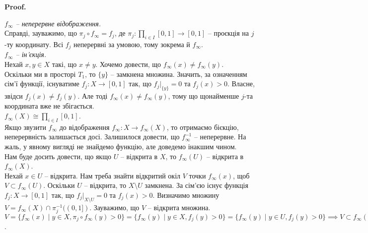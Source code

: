 \documentclass[a4paper, 10pt]{article}
\makeatletter
\theoremstyle{theoremdd}
\renewenvironment{proof}[1][Proof.\\]{\par
\pushQED{\hfill \qed}%
\normalfont \topsep6\p@\@plus6\p@\relax
\trivlist
\item\relax
{\bfseries
#1\@addpunct{.}}\hspace\labelsep\ignorespaces
}{%
\popQED\endtrivlist\@endpefalse
}
\makeatother
\begin{document}
\begin{proof}
\textit{$f_\infty$ -- неперервне відображення.}\\
Справді, зауважимо, що $\pi_j \circ f_\infty = f_j$, де $\pi_j \colon \displaystyle\prod_{i \in I} [0,1] \to [0,1]$ -- проєкція на $j$-ту координату. Всі $f_j$ неперервні за умовою, тому зокрема й $f_\infty$.
\bigskip \\
\textit{$f_\infty$ -- ін'єкція.}\\
Нехай $x,y \in X$ такі, що $x \neq y$. Хочемо довести, що $f_\infty(x) \neq f_\infty(y)$.\\
Оскільки ми в просторі $T_1$, то $\{y\}$ -- замкнена множина. Значить, за означенням сім'ї функції, існуватиме $f_j \colon X \to [0,1]$ так, що $f_j|_{\{y\}} = 0$ та $f_j(x) > 0$. Власне, звідси $f_j(x) \neq f_j(y)$. Але тоді $f_\infty(x) \neq f_\infty(y)$, тому що щонайменше $j$-та координата вже не збігається.
\bigskip \\
\textit{$f_\infty(X) \cong \displaystyle\prod_{i \in I} [0,1]$.}\\
Якщо звузити $f_\infty$ до відображення $f_\infty \colon X \to f_\infty(X)$, то отримаємо бієкцію, неперервність залишається досі. Залишилося довести, що $f_\infty^{-1}$ -- неперервне. На жаль, у явному вигляді не знайдемо функцію, але доведемо інакшим чином.\\
Нам буде досить довести, що якщо $U$ -- відкрита в $X$, то $f_\infty(U)$ -- відкрита в $f_\infty(X)$.\\
Нехай $x \in U$ -- відкрита. Нам треба знайти відкритий окіл $V$ точки $f_\infty(x)$, щоб $V \subset f_\infty(U)$. Оскільки $U$ -- відкрита, то $X \setminus U$ замкнена. За сім'єю існує функція $f_j \colon X \to [0,1]$ так, що $f_j|_{X \setminus U} = 0$ та $f_j(x) > 0$. Визначимо множину $V = f_\infty(X) \cap \pi_j^{-1}((0,1])$. Зауважимо, що $V$ -- відкрита множина.\\
$V = \{f_\infty(x) \mid y \in X, \pi_j \circ f_\infty(y) > 0\} = \{f_\infty(y) \mid y \in X, f_j(y) > 0\} = \{f_\infty(y) \mid y \in U, f_j(y) > 0\} \implies V \subset f_\infty(U)$.
\end{proof}
\end{document}

